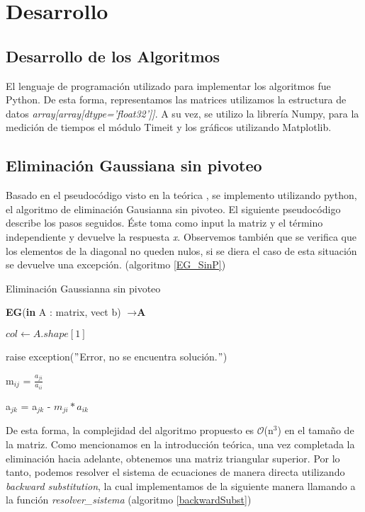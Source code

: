 \section{Desarrollo}
\subsection{Desarrollo de los Algoritmos}

El lenguaje de programación utilizado para implementar los algoritmos fue Python. De esta forma, representamos las matrices utilizamos la estructura de datos \textit{array[array[dtype='float32']]}. 
A su vez, se utilizo la librería Numpy, para la medición de tiempos el módulo Timeit y los gráficos utilizando Matplotlib.

\subsection{Eliminación Gaussiana sin pivoteo}

Basado en el pseudocódigo visto en la teórica \cite{teoEG}, se implemento utilizando python, el algoritmo de eliminación Gausianna sin pivoteo. 
El siguiente pseudocódigo describe los pasos seguidos. Éste toma como input la matriz y el término independiente y devuelve la respuesta \textit{x}. Observemos también que se verifica que los elementos de la diagonal no queden nulos, si se diera el caso de esta situación se devuelve una excepción. (algoritmo \ref{EG_SinP})


\begin{algorithm}
\caption{Eliminación Gaussianna sin pivoteo}
\label{EG_sinP}
\begin{algorithmic}
\State \textbf{EG}(\textbf{in} A : matrix, vect b) $\to \textbf{A}$
 
 \State $col \gets A.shape[1]$
 
        \State  raise exception($"$Error, no se encuentra solución.$"$) 
    \EndIf
\EndFor
{}

    \State m$_{ij}$ = $\frac{a_{ji}}{a_{ii}}$
    
        \State a$_{jk}$ = a$_{jk}$ - $m_{ji}*{a_{ik}}$
    \EndFor

\EndFor
\end{algorithmic}
\end{algorithm}

De esta forma, la complejidad del algoritmo propuesto es $\mathcal{O}$(n$^3$) en el tamaño de la matriz.
Como mencionamos en la introducción teórica, una vez completada la eliminación hacia adelante, obtenemos una matriz triangular superior. Por lo tanto, podemos resolver el sistema de ecuaciones de manera directa utilizando \textit{backward substitution}, la cual implementamos de la siguiente manera llamando a la función \textit{resolver\_sistema} (algoritmo \ref{backwardSubst})

